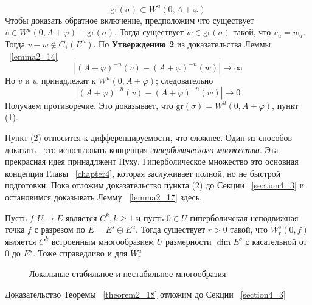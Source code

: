 \begin{demo}
$$
\mathrm{gr}(\sigma) \subset W^u(0, A + \varphi)
$$
Чтобы доказать обратное включение, предположим что существует $v \in W^u(0,A+\varphi) - \mathrm{gr}(\sigma)$. Тогда существует $w \in \mathrm{gr}(\sigma)$ такой, что $v_u=w_u$. Тогда $v-w \notin C_1(E^u)$. По  \textbf{Утверждению 2} из доказательства Леммы ~\ref{lemma2_14}
$$
|(A+\varphi)^{-n}(v)-(A+\varphi)^{-n}(w)| \rightarrow \infty
$$
Но $v$ и $w$ принадлежат к $W^u(0,A+\varphi)$; следовательно
$$
|(A+\varphi)^{-n}(v)-(A+\varphi)^{-n}(w)| \rightarrow 0
$$
Получаем противоречие. Это доказывает, что $\mathrm{gr}(\sigma)=W^u(0,A+\varphi)$, пункт (1).

Пункт (2) относится к дифференцируемости, что сложнее.  Один из способов доказать - это использовать концепция \textit{гиперболического множества}. Эта прекрасная идея принадлжеит Пуху. Гиперболическое множество это основная концепция Главы ~\ref{chapter4}, которая заслуживает полной, но не быстрой подготовки. Пока отложим доказательство пункта (2) до Секции ~\ref{section4_3} и остановимся доказывать Лемму ~\ref{lemma2_17} здесь.    
\end{demo}

\begin{theorem}
\label{theorem2_18}
Пусть $f: U \rightarrow E$ является $C^k, k \geqslant 1$ и пусть $0 \in U$ гиперболичская неподвижная точка $f$ с разрезом по $E=E^s \oplus E^u$. Тогда существует $r >0$ такой, что $W^s_r(0,f)$ является $C^k$ встроенным многообразием $U$ размерности $\dim E^s$ с касательной от $0$ до $E^s$. Тоже справедливо и для $W^u_r$  
\end{theorem}

\begin{figure}[h]
\begin{center}
\begin{minipage}{.85\textwidth}
\begin{center}
\caption{Локальные стабильное и нестабильное многообразия.}
\label{picture2_11}
\end{center}
\end{minipage}
\end{center}
\end{figure}

Доказательство Теоремы ~\ref{theorem2_18} отложим до Секции ~\ref{section4_3}